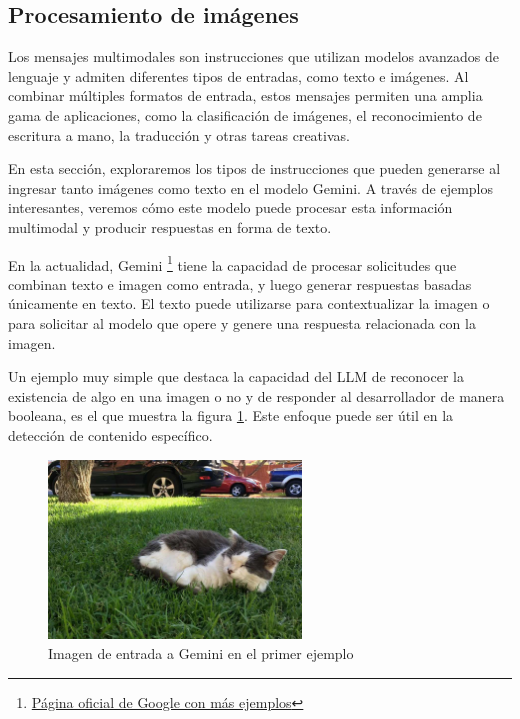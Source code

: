 \subsection{Procesamiento de imágenes}

Los mensajes multimodales son instrucciones que utilizan modelos avanzados de lenguaje y admiten diferentes tipos de entradas, como texto e imágenes. Al combinar múltiples formatos de entrada, estos mensajes permiten una amplia gama de aplicaciones, como la clasificación de imágenes, el reconocimiento de escritura a mano, la traducción y otras tareas creativas.

En esta sección, exploraremos los tipos de instrucciones que pueden generarse al ingresar tanto imágenes como texto en el modelo Gemini. A través de ejemplos interesantes, veremos cómo este modelo puede procesar esta información multimodal y producir respuestas en forma de texto.

En la actualidad, Gemini \footnote{\href{https://developers.google.com/solutions/content-driven/ai-images}{Página oficial de Google con más ejemplos}} tiene la capacidad de procesar solicitudes que combinan texto e imagen como entrada, y luego generar respuestas basadas únicamente en texto. El texto puede utilizarse para contextualizar la imagen o para solicitar al modelo que opere y genere una respuesta relacionada con la imagen.

Un ejemplo muy simple que destaca la capacidad del LLM de reconocer la existencia de algo en una imagen o no y de responder al desarrollador de manera booleana, es el que muestra la figura \ref{fig:gemini-1}. Este enfoque puede ser útil en la detección de contenido específico.

\begin{figure}[h]
	\centering
	\includegraphics[width=0.6\textwidth]{Imagenes/ImagenesGemini/gemini-2}
	\caption{Imagen de entrada a Gemini en el primer ejemplo}
	\label{fig:gemini-1}
\end{figure}
 
